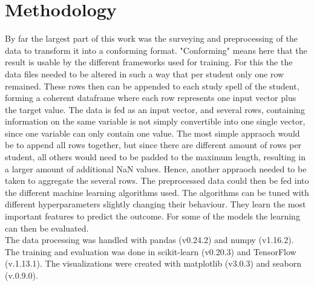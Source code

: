 
\section{Methodology}
By far the largest part of this work was the surveying and preprocessing of the data to transform it into a conforming format. "Conforming" means here that the result is usable by the different frameworks used for training. For this the the data files needed to be altered in such a way that per student only one row remained. These rows then can be appended to each study spell of the student, forming a coherent dataframe where each row represents one input vector plus the target value. The data is fed as an input vector, and several rows, containing information on the same variable is not simply convertible into one single vector, since one variable can only contain one value. The most simple appraoch would be to append all rows together, but since there are different amount of rows per student, all others would need to be padded to the maximum length, resulting in a larger amount of additional NaN values. Hence, another appraoch needed to be taken to aggregate the several rows. The preprocessed data could then be fed into the different machine learning algorithms used. The algorithms can be tuned with different hyperparameters slightly changing their behaviour. They learn the most important features to predict the outcome. For some of the models the learning can then be evaluated.\\
The data processing was handled with pandas (v0.24.2)\cite{WesMcKinney.2010} and numpy (v1.16.2)\cite{vanderWalt.2011}. The training and evaluation was done in scikit-learn (v0.20.3)\cite{Pedregosa.2011} and TensorFlow (v.1.13.1)\cite{Abadi.20160531}. The visualizations were created with matplotlib (v3.0.3)\cite{Hunter.2007} and seaborn (v.0.9.0)\cite{Waskom.2018}.

